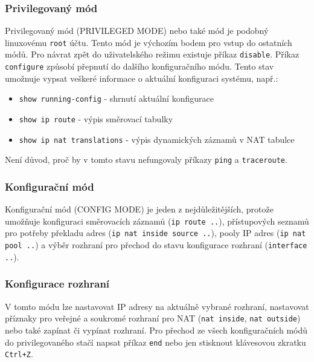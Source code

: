\subsubsection{Privilegovaný mód}
Privilegovaný mód (PRIVILEGED MODE) nebo také  mód je podobný linuxovému \verb|root| účtu. Tento mód je výchozím bodem pro vstup do ostatních módů. Pro návrat zpět do uživatelského režimu existuje příkaz \verb|disable|. Příkaz \verb|configure| způsobí přepnutí do dalšího konfiguračního módu. Tento stav umožnuje vypsat veškeré informace o aktuální konfiguraci systému, např.:
\begin{itemize}
 \item \verb|show running-config| - shrnutí aktuální konfigurace
 \item \verb|show ip route| - výpis směrovací tabulky
 \item \verb|show ip nat translations| - výpis dynamických záznamů v NAT tabulce
\end{itemize}
Není důvod, proč by v tomto stavu nefungovaly příkazy \verb|ping| a \verb|traceroute|.

\subsubsection{Konfigurační mód}
Konfigurační mód (CONFIG MODE) je jeden z nejdůležitějších, protože umožňuje konfiguraci směrovacích záznamů (\verb|ip route ..|), přístupových seznamů pro potřeby překladu adres (\verb|ip nat inside source ..|), pooly IP adres (\verb|ip nat pool ..|) a výběr rozhraní pro přechod do stavu konfigurace rozhraní (\verb|interface ..|).

\subsubsection{Konfigurace rozhraní}
V tomto módu lze nastavovat IP adresy na aktuálně vybrané rozhraní, nastavovat příznaky pro veřejné a soukromé rozhraní pro NAT (\verb|nat inside|, \verb|nat outside|) nebo také zapínat či vypínat rozhraní. Pro přechod ze všech konfiguračních módů do privilegovaného stačí napsat příkaz \verb|end| nebo jen stisknout klávesovou zkratku \verb|Ctrl+Z|.


